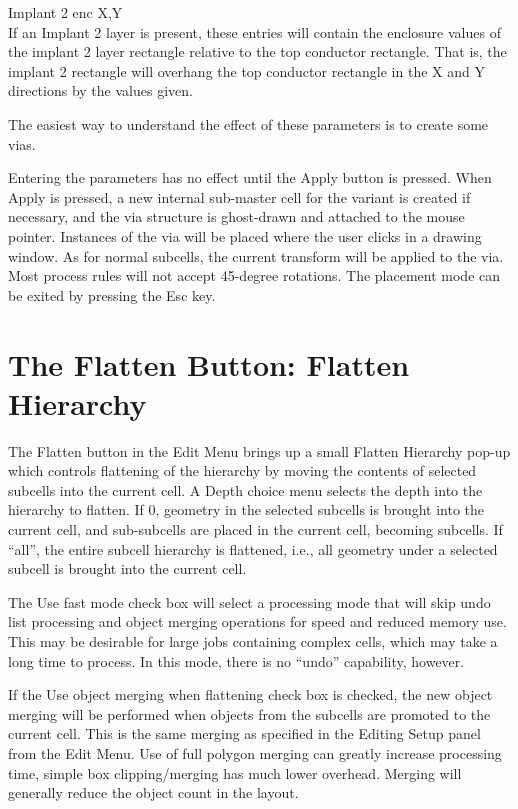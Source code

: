 \begin{description}
\item{\cb Implant 2 enc X,Y}\\
If an {\cb Implant 2} layer is present, these entries will contain the
enclosure values of the implant 2 layer rectangle relative to the top
conductor rectangle.  That is, the implant 2 rectangle will overhang
the top conductor rectangle in the X and Y directions by the values
given.
\end{description}

The easiest way to understand the effect of these parameters is to
create some vias.

Entering the parameters has no effect until the {\cb Apply} button is
pressed.  When {\cb Apply} is pressed, a new internal sub-master cell
for the variant is created if necessary, and the via structure is
ghost-drawn and attached to the mouse pointer.  Instances of the via
will be placed where the user clicks in a drawing window.  As for
normal subcells, the current transform will be applied to the via. 
Most process rules will not accept 45-degree rotations.  The placement
mode can be exited by pressing the {\kb Esc} key.


\section{The {\cb Flatten} Button: Flatten Hierarchy}
The {\cb Flatten} button in the {\cb Edit Menu} brings up a small {\cb
Flatten Hierarchy} pop-up which controls flattening of the hierarchy
by moving the contents of selected subcells into the current cell.  A
{\cb Depth} choice menu selects the depth into the hierarchy to
flatten.  If 0, geometry in the selected subcells is brought into the
current cell, and sub-subcells are placed in the current cell,
becoming subcells.  If ``{\vt all}'', the entire subcell hierarchy is
flattened, i.e., all geometry under a selected subcell is brought into
the current cell.

The {\cb Use fast mode} check box will select a processing mode that
will skip undo list processing and object merging operations for speed
and reduced memory use.  This may be desirable for large jobs
containing complex cells, which may take a long time to process.  In
this mode, there is no ``undo'' capability, however.

If the {\cb Use object merging when flattening} check box is checked,
the new object merging will be performed when objects from the
subcells are promoted to the current cell.  This is the same merging
as specified in the {\cb Editing Setup} panel from the {\cb Edit
Menu}.  Use of full polygon merging can greatly increase processing
time, simple box clipping/merging has much lower overhead.  Merging
will generally reduce the object count in the layout.

